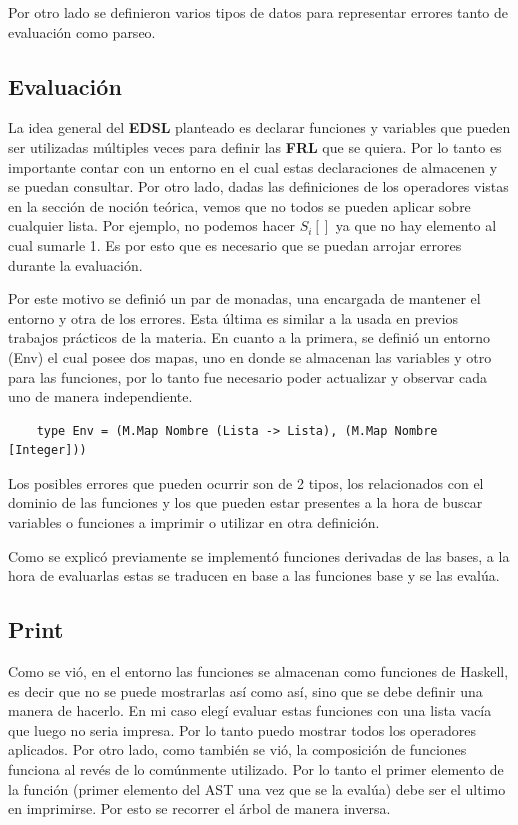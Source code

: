 \documentclass[a4paper,13pt,proof]{article}
\theoremstyle{mytheor}
\begin{document}
Por otro lado se definieron varios tipos de datos para representar errores tanto de evaluación como parseo.

\subsection{Evaluación}

La idea general del \textbf{EDSL} planteado es declarar funciones y variables que pueden ser utilizadas múltiples veces para definir las \textbf{FRL} que se quiera. Por lo tanto es importante contar con un entorno en el cual estas declaraciones de almacenen y se puedan consultar. Por otro lado, dadas las definiciones de los operadores vistas en la sección de noción teórica, vemos que no todos se pueden aplicar sobre cualquier lista. Por ejemplo, no podemos hacer $S_i []$ ya que no hay elemento al cual sumarle 1. Es por esto que es necesario que se puedan arrojar errores durante la evaluación. 

Por este motivo se definió un par de monadas, una encargada de mantener el entorno y otra de los errores. Esta última es similar a la usada en previos trabajos prácticos de la materia. En cuanto a la primera, se definió un entorno (Env) el cual posee dos mapas, uno en donde se almacenan las variables y otro para las funciones, por lo tanto fue necesario poder actualizar y observar cada uno de manera independiente.
\begin{verbatim}
    type Env = (M.Map Nombre (Lista -> Lista), (M.Map Nombre [Integer]))
\end{verbatim}

Los posibles errores que pueden ocurrir son de 2 tipos, los relacionados con el dominio de las funciones y los que pueden estar presentes a la hora de buscar variables o funciones a imprimir o utilizar en otra definición.

Como se explicó previamente se implementó funciones derivadas de las bases, a la hora de evaluarlas estas se traducen en base a las funciones base y se las evalúa.

\subsection{Print}

Como se vió, en el entorno las funciones se almacenan como funciones de Haskell, es decir que no se puede mostrarlas así como así, sino que se debe definir una manera de hacerlo. En mi caso elegí evaluar estas funciones con una lista vacía que luego no seria impresa. Por lo tanto puedo mostrar todos los operadores aplicados. Por otro lado, como también se vió, la composición de funciones funciona al revés de lo comúnmente utilizado. Por lo tanto el primer elemento de la función (primer elemento del AST una vez que se la evalúa) debe ser el ultimo en imprimirse. Por esto se recorrer el árbol de manera inversa.
\end{document}

